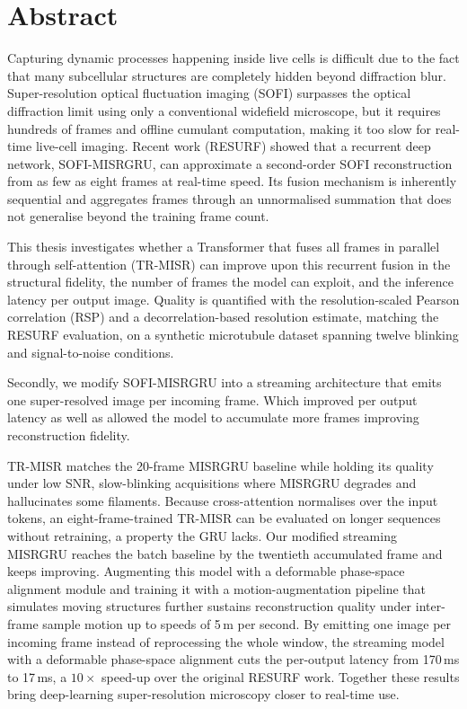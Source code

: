 \chapter*{Abstract}

Capturing dynamic processes happening inside live cells is difficult due to the fact that
many subcellular structures are completely hidden beyond diffraction blur.
Super-resolution optical fluctuation imaging (SOFI) surpasses the optical diffraction
limit using only a conventional widefield microscope, but it requires hundreds of frames
and offline cumulant computation, making it too slow for real-time live-cell imaging.
Recent work (RESURF) showed that a recurrent deep network, SOFI-MISRGRU, can approximate a
second-order SOFI reconstruction from as few as eight frames at real-time speed. Its
fusion mechanism is inherently sequential and aggregates frames through an
unnormalised summation that does not generalise beyond the training frame count.

This thesis investigates whether a Transformer that fuses all frames in parallel through
self-attention (TR-MISR) can improve upon this recurrent fusion in the structural 
fidelity, 
the number of frames the model can
exploit, and the inference latency per output image. Quality is quantified with the
resolution-scaled Pearson correlation (RSP) and a decorrelation-based resolution estimate,
matching the RESURF evaluation, on a synthetic microtubule dataset spanning twelve blinking
and signal-to-noise conditions. 

Secondly, we modify SOFI-MISRGRU into a streaming
architecture that emits one super-resolved image per incoming frame. Which improved per output latency
as well as allowed the model to accumulate more frames improving reconstruction fidelity.

TR-MISR matches the 20-frame MISRGRU baseline while holding its quality under low SNR,
slow-blinking acquisitions where MISRGRU degrades and hallucinates some filaments.
Because cross-attention normalises over the input tokens, an eight-frame-trained TR-MISR can
be evaluated on longer sequences without retraining, a property the GRU lacks. Our modified
streaming MISRGRU reaches the batch baseline by the twentieth accumulated frame
and keeps improving. Augmenting this model with a deformable phase-space alignment module and
training it with a motion-augmentation pipeline that simulates moving structures further
sustains reconstruction quality under inter-frame sample motion up to speeds of 5\,\textmu m per second.
By emitting one image per incoming frame instead of reprocessing the whole window, the
streaming model with a deformable phase-space alignment cuts the per-output latency 
from 170\,ms to 17\,ms, a $10\times$ speed-up over the original RESURF work.
Together these results bring deep-learning super-resolution microscopy closer to real-time use.
